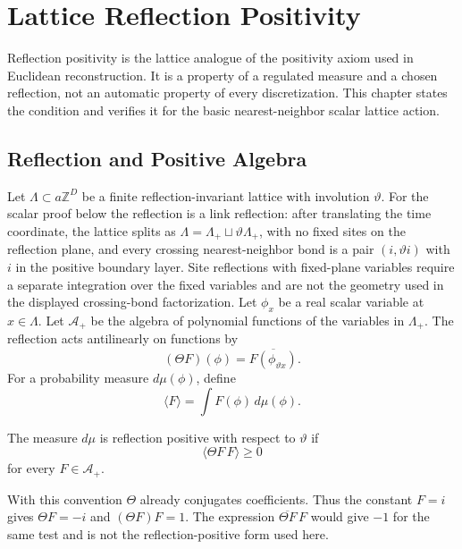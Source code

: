 \chapter{Lattice Reflection Positivity}
\label{ch:lattice-reflection-positivity}

\ConventionsEuclidean

Reflection positivity is the lattice analogue of the positivity axiom used in
Euclidean reconstruction.  It is a property of a regulated measure and a
chosen reflection, not an automatic property of every discretization.  This
chapter states the condition and verifies it for the basic nearest-neighbor
scalar lattice action.

\section{Reflection and Positive Algebra}

Let \(\Lambda\subset a\mathbb Z^D\) be a finite reflection-invariant lattice
with involution \(\vartheta\).  For the scalar proof below the reflection is a
link reflection: after translating the time coordinate, the lattice splits as
\(\Lambda=\Lambda_+\sqcup\vartheta\Lambda_+\), with no fixed sites on the
reflection plane, and every crossing nearest-neighbor bond is a pair
\((i,\vartheta i)\) with \(i\) in the positive boundary layer.  Site
reflections with fixed-plane variables require a separate integration over
the fixed variables and are not the geometry used in the displayed
crossing-bond factorization.  Let \(\phi_x\) be a real scalar variable at
\(x\in\Lambda\).  Let \(\mathcal A_+\) be the algebra of polynomial functions
of the variables in \(\Lambda_+\).  The reflection acts antilinearly on
functions by
\[
  (\Theta F)(\phi)=\overline{F(\phi_{\vartheta x})}.
\]
For a probability measure \(d\mu(\phi)\), define
\[
  \langle F\rangle=\int F(\phi)\,d\mu(\phi).
\]

\begin{definition}
\label{def:lattice-reflection-positivity}
The measure \(d\mu\) is reflection positive with respect to
\(\vartheta\) if
\[
  \langle \Theta F\,F\rangle\ge 0
\]
for every \(F\in\mathcal A_+\).
\end{definition}

With this convention \(\Theta\) already conjugates coefficients.  Thus the
constant \(F=i\) gives \(\Theta F=-i\) and
\((\Theta F)F=1\).  The expression \(\overline{\Theta F}\,F\) would give
\(-1\) for the same test and is not the reflection-positive form used here.


